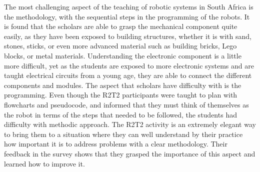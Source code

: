 \documentclass{intech-journal}
\begin{document}
The most challenging aspect of the teaching of robotic systems in South Africa is the methodology, with the sequential steps in the programming of the robots. 
It is found that the scholars are able to grasp the mechanical component quite easily, as they have been exposed to building structures, whether it is with sand, stones, sticks, or even more advanced material such as building bricks, Lego blocks, or metal materials. 
Understanding the electronic component is a little more difficult, yet as the students are exposed to more electronic systems and are taught electrical circuits from a young age, they are able to connect the different components and modules. 
The aspect that scholars have difficulty with is the programming. 
Even though the R2T2 participants were taught to plan with flowcharts and pseudocode, and informed that they must think of themselves as the robot in terms of the steps that needed to be followed, the students had difficulty with methodic approach. 
The R2T2 activity is an extremely elegant way to bring them to a situation where they can well understand by their practice how important it is to address problems with a clear methodology. 
Their feedback in the survey shows that they grasped the importance of this aspect and learned how to improve it.

\end{document}
